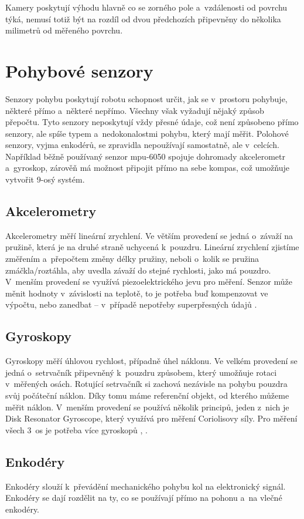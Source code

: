 Kamery poskytují výhodu hlavně co se zorného pole a~vzdálenosti od povrchu týká, nemusí totiž být na rozdíl od dvou předchozích připevněny do několika milimetrů od měřeného povrchu.

\section{Pohybové senzory} 
Senzory pohybu poskytují robotu schopnost určit, jak se v~prostoru pohybuje, některé přímo a~některé nepřímo.
Všechny však vyžadují nějaký způsob přepočtu.
Tyto senzory neposkytují vždy přesné údaje, což není způsobeno přímo senzory, ale spíše typem a~nedokonalostmi pohybu, který mají měřit.
Polohové senzory, vyjma enkodérů, se zpravidla nepoužívají samostatně, ale v~celcích.
Například běžně používaný senzor mpu-6050 \cite{mpu6050} spojuje dohromady akcelerometr a~gyroskop, zárověň má možnost připojit přímo na sebe kompas, což umožňuje vytvořit 9-osý systém.


\subsection{Akcelerometry}
Akcelerometry měří lineární zrychlení.
Ve větším provedení se jedná o~závaží na pružině, která je na druhé straně uchycená k~pouzdru. 
Lineární zrychlení zjistíme změřením a~přepočtem změny délky pružiny, neboli o~kolik se pružina zmáčkla/roztáhla, aby uvedla závaží do stejné rychlosti, jako má pouzdro.
V~menším provedení se využívá piezoelektrického jevu pro měření.
Senzor může měnit hodnoty v~závislosti na teplotě, to je potřeba buď kompenzovat ve výpočtu, nebo zanedbat -- v~případě nepotřeby superpřesných údajů \cite{accel}.

\subsection{Gyroskopy}
Gyroskopy měří úhlovou rychlost, případně úhel náklonu.
Ve velkém provedení se jedná o~setrvačník připevněný k~pouzdru způsobem, který umožňuje rotaci v~měřených osách.
Rotující setrvačník si zachová nezávisle na pohybu pouzdra svůj počáteční náklon.
Díky tomu máme referenční objekt, od kterého můžeme měřit náklon.
V~menším provedení se používá několik principů, jeden z~nich je Disk Resonator Gyroscope, který využívá pro měření Coriolisovy síly.
Pro měření všech 3~os je potřeba více gyroskopů
\cite{gyro},
\cite{gyro-2}.

\subsection{Enkodéry}
Enkodéry slouží k~převádění mechanického pohybu kol na elektronický signál.
Enkodéry se dají rozdělit na ty, co se používají přímo na pohonu a~na vlečné enkodéry.

